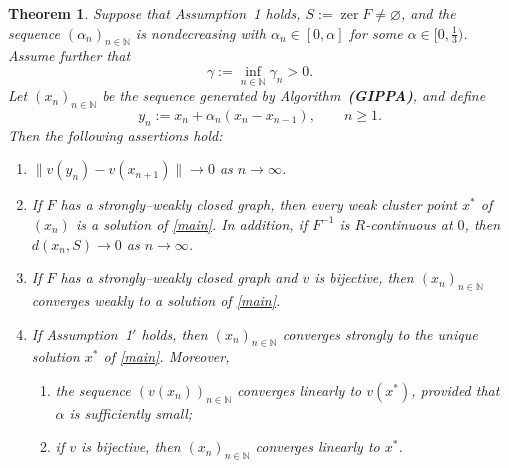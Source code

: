\documentclass[11pt]{article}
\newtheorem{theorem}{Theorem}[section]
\theoremstyle{definition}
\theoremstyle{definition}
\theoremstyle{definition}
\newcommand{\zer}{\ensuremath{\operatorname{zer}}}
\begin{document}
\begin{theorem}\label{t:warped}
{Suppose that Assumption~1 holds,  \( S:=\zer F \neq \varnothing \), and  the sequence}
\( (\alpha_n)_{n\in\mathbb{N}} \) is nondecreasing with \( \alpha_n \in [0,\alpha] \) for some
\( \alpha \in [0,\tfrac{1}{3}) \).
Assume further that
\[
\gamma := \inf_{n\in\mathbb{N}} \gamma_n > 0.
\]
Let \( (x_n)_{n\in\mathbb{N}} \) be the sequence generated by Algorithm~\textbf{(GIPPA)}, and define
\[
y_n := x_n + \alpha_n (x_n - x_{n-1}), \qquad n \ge 1.
\]
Then the following assertions hold:
\begin{enumerate}
\item\label{t:warped_a}
\( \|v(y_n) - v(x_{n+1})\| \to 0 \) as \( n \to \infty \).

\item\label{t:warped_b}
{If \( F \) has a strongly--weakly closed graph,  then every weak cluster point \( x^* \) of \( (x_n) \) is a solution of \eqref{main}}.
In addition, if  \( F^{-1} \) is \( R \)-continuous at \( 0 \), then
\( d(x_n,S) \to 0 \) as \( n \to \infty \).




\item\label{t:warped_weakcvg}
If \( F \) has a strongly--weakly closed graph and {\( v \) is bijective}, 
then \( (x_n)_{n\in\mathbb{N}} \) converges weakly to a solution of \eqref{main}.

\item\label{t:warped_strongcvg}
If Assumption~1\( '\) holds, then \( (x_n)_{n\in\mathbb{N}} \) converges strongly to the unique solution
\( x^* \) of \eqref{main}. Moreover,
\begin{enumerate}
\item\label{t:warped_strongcvg_v}
the sequence \( (v(x_n))_{n\in\mathbb{N}} \) converges linearly to \( v(x^*) \), provided that
\( \alpha \) is sufficiently small;

\item\label{t:warped_strongcvg_x}
if {\( v \) is bijective}, then
\( (x_n)_{n\in\mathbb{N}} \) converges linearly to \( x^* \).
\end{enumerate}
\end{enumerate}
\end{theorem}
\end{document}
